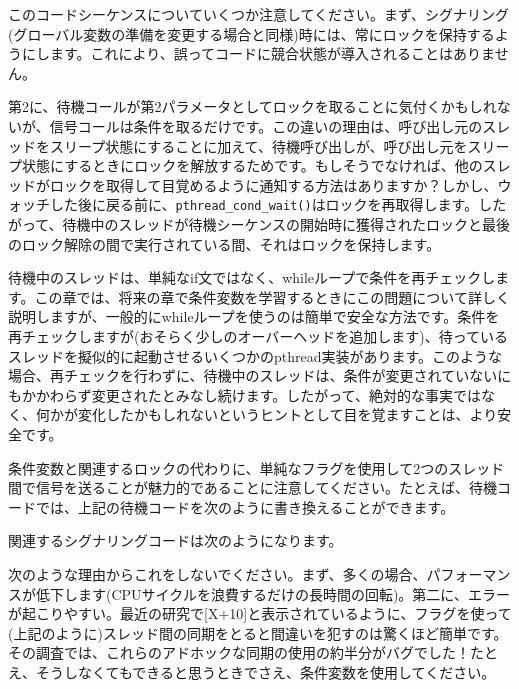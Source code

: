 このコードシーケンスについていくつか注意してください。まず、シグナリング(グローバル変数の準備を変更する場合と同様)時には、常にロックを保持するようにします。これにより、誤ってコードに競合状態が導入されることはありません。

第2に、待機コールが第2パラメータとしてロックを取ることに気付くかもしれないが、信号コールは条件を取るだけです。この違いの理由は、呼び出し元のスレッドをスリープ状態にすることに加えて、待機呼び出しが、呼び出し元をスリープ状態にするときにロックを解放するためです。もしそうでなければ、他のスレッドがロックを取得して目覚めるように通知する方法はありますか？しかし、ウォッチした後に戻る前に、\texttt{pthread\_cond\_wait()}はロックを再取得します。したがって、待機中のスレッドが待機シーケンスの開始時に獲得されたロックと最後のロック解除の間で実行されている間、それはロックを保持します。

待機中のスレッドは、単純なif文ではなく、whileループで条件を再チェックします。この章では、将来の章で条件変数を学習するときにこの問題について詳しく説明しますが、一般的にwhileループを使うのは簡単で安全な方法です。条件を再チェックしますが(おそらく少しのオーバーヘッドを追加します)、待っているスレッドを擬似的に起動させるいくつかのpthread実装があります。このような場合、再チェックを行わずに、待機中のスレッドは、条件が変更されていないにもかかわらず変更されたとみなし続けます。したがって、絶対的な事実ではなく、何かが変化したかもしれないというヒントとして目を覚ますことは、より安全です。

条件変数と関連するロックの代わりに、単純なフラグを使用して2つのスレッド間で信号を送ることが魅力的であることに注意してください。たとえば、待機コードでは、上記の待機コードを次のように書き換えることができます。

\begin{Shaded}
\begin{Highlighting}[]
\NormalTok{)}
\NormalTok{; }
\end{Highlighting}
\end{Shaded}

関連するシグナリングコードは次のようになります。

\begin{Shaded}
\begin{Highlighting}[]
\NormalTok{;}
\end{Highlighting}
\end{Shaded}

次のような理由からこれをしないでください。まず、多くの場合、パフォーマンスが低下します(CPUサイクルを浪費するだけの長時間の回転)。第二に、エラーが起こりやすい。最近の研究で{[}X+10{]}と表示されているように、フラグを使って(上記のように)スレッド間の同期をとると間違いを犯すのは驚くほど簡単です。その調査では、これらのアドホックな同期の使用の約半分がバグでした！たとえ、そうしなくてもできると思うときでさえ、条件変数を使用してください。

